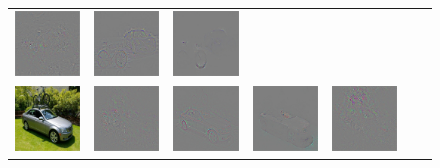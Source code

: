 \begin{figure}
\begin{center}
\begin{tabular}{ccccccc}
\includegraphics[width=0.14\linewidth,height=0.115\linewidth]{figs/examples/googlenet/oxford/bic-car1_diff_672} &
\includegraphics[width=0.14\linewidth,height=0.115\linewidth]{figs/examples/googlenet/deconv/bic-car1_diff_672} &
\includegraphics[width=0.14\linewidth,height=0.115\linewidth]{figs/examples/googlenet/soft/bic-car1_diff_672} \\
\vspace{-2.5pt}
\includegraphics[width=0.14\linewidth,height=0.115\linewidth]{figs/examples/googlenet/oxford/bic-car2} &
\includegraphics[width=0.14\linewidth,height=0.115\linewidth]{figs/examples/googlenet/oxford/bic-car2_diff_818} &
\includegraphics[width=0.14\linewidth,height=0.115\linewidth]{figs/examples/googlenet/deconv/bic-car2_diff_818} &
\includegraphics[width=0.14\linewidth,height=0.115\linewidth]{figs/examples/googlenet/soft/bic-car2_diff_818} &
\includegraphics[width=0.14\linewidth,height=0.115\linewidth]{figs/examples/googlenet/oxford/bic-car2_diff_672} &

\end{tabular}
\end{center}
\end{figure}
